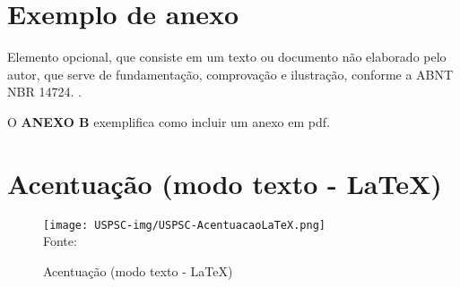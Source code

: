 \begin{anexosenv}

\partanexos

\chapter{Exemplo de anexo}
Elemento opcional, que consiste em um texto ou documento n\~ao elaborado pelo autor, que serve de fundamenta\c{c}\~ao, comprova\c{c}\~ao e ilustra\c{c}\~ao, conforme a ABNT NBR 14724. \cite{nbr14724}.

O \textbf{ANEXO B} exemplifica como incluir um anexo em pdf.

\chapter{Acentua\c{c}\~ao (modo texto - \LaTeX)}
\begin{figure}[H]
	\begin{center}
	\caption{\label{fig_anexob}Acentua\c{c}\~ao (modo texto - \LaTeX)}
	\texttt{[image: USPSC-img/USPSC-AcentuacaoLaTeX.png]} \\
	Fonte: 
	\end{center}	
\end{figure}

\end{anexosenv}
